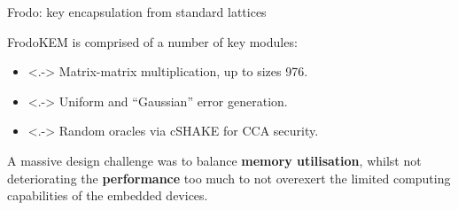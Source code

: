\documentclass{beamer}            %
\begin{document}
\begin{frame}{Frodo: key encapsulation from standard lattices}

\textsf{FrodoKEM} is comprised of a number of key modules:

\begin{itemize}[<+->]
\item<.-> Matrix-matrix multiplication, up to sizes 976.

\item<.-> Uniform and ``Gaussian'' error generation.

\item<.-> Random oracles via cSHAKE for CCA security.

\end{itemize}

A massive design challenge was to balance \textbf{memory utilisation}, whilst not deteriorating the \textbf{performance} too much to not overexert the limited computing capabilities of the embedded devices.

\end{frame}

\end{document}
